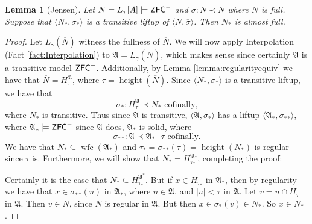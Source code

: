 \documentclass{amsart}
\newtheorem{lemma}[theorem]{Lemma}
\theoremstyle{definition}
\theoremstyle{remark}
\newcommand{\N}{{\overline{N}}}
\newcommand{\ZFC}{\textup{\ensuremath{\textsf{ZFC}}}}
\DeclareMathOperator{\height}{height}
\DeclareMathOperator{\wfc}{wfc}
\begin{document}
\begin{lemma}[Jensen]\label{lemma:liftupfull} Let $N =L_\tau[A] \models \ZFC^-$ and $\sigma: \N \prec N$ where $\N$ is full. Suppose that $\langle N_*, \sigma_* \rangle$ is a transitive liftup of $\langle \N, \overline \sigma \rangle$. Then $N_*$ is almost full. \end{lemma}
\begin{proof}
	Let $L_\gamma(\N)$ witness the fullness of $\N$. We will now apply Interpolation (Fact \ref{fact:Interpolation}) to $\mathfrak A= L_\gamma(\N)$, which makes sense since certainly $\mathfrak A$ is a transitive model $\ZFC^-$. Additionally, by Lemma \ref{lemma:regularityequiv} we have that $\N = H_\tau^{\mathfrak A}$, where $\tau = \height(\N)$. Since $\langle N_*, \sigma_* \rangle$ is a transitive liftup, we have that $$\sigma_*: H_\tau^{\mathfrak A} \prec N_* \text{ cofinally,}$$ where $N_*$ is transitive. Thus since $\mathfrak A$ is transitive, $\langle \mathfrak A, \sigma_* \rangle$ has a liftup $\langle \mathfrak A_*, {\sigma_*}_* \rangle$, where $\mathfrak A_* \models \ZFC^-$ since $\mathfrak A$ does, $\mathfrak A_*$ is solid, where $${\sigma_*}_* : \mathfrak A \prec \mathfrak A_* \text{ $\tau$-cofinally.}$$ 
	We have that  $N_* \subseteq \wfc({\mathfrak A}_*)$ and $\tau_*= {\sigma_*}_*(\tau)=\height(N_*)$ is regular since $\tau$ is. Furthermore, we will show that $N_* = H_{\tau_*}^{\mathfrak A_*}$, completing the proof:
	
	Certainly it is the case that $N_* \subseteq H_{\tau_*}^{\mathfrak A^*}$. 
	But if $x \in H_{\tau_*}$ in $\mathfrak A_*$, then by regularity we have that $x \in {\sigma_*}_*(u)$ in $\mathfrak A_*$, where $u \in \mathfrak A$, and $|u| < \tau$ in $\mathfrak A$. Let $v=u \cap H_\tau$ in $\mathfrak A$. Then $v \in \N$, since $\N$ is regular in $\mathfrak A$. But then $x \in \sigma_*(v) \in N_*$. So $x \in N_*$.
\end{proof}
\end{document}
